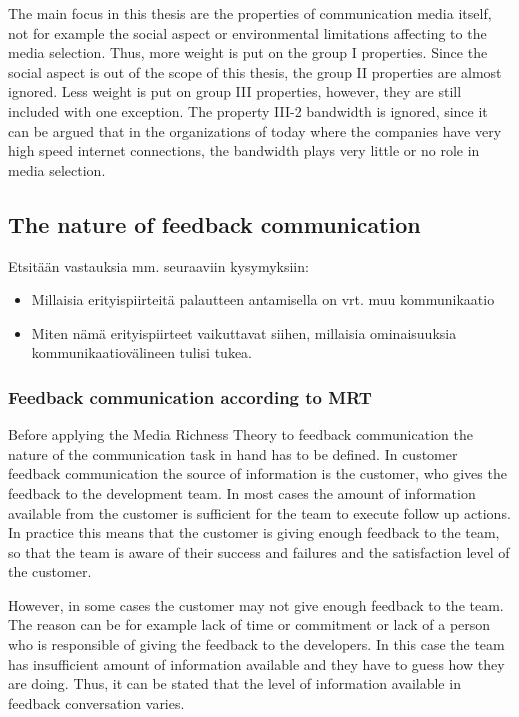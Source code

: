 \documentclass[english,12pt,a4paper,pdftex]{article}
\begin{document}
The main focus in this thesis are the properties of communication media itself, not for example the social aspect or environmental limitations affecting to the media selection. Thus, more weight is put on the group I properties. Since the social aspect is out of the scope of this thesis, the group II properties are almost ignored. Less weight is put on group III properties, however, they are still included with one exception. The property III-2 bandwidth is ignored, since it can be argued that in the organizations of today where the companies have very high speed internet connections, the bandwidth plays very little or no role in media selection.

\subsection{The nature of feedback communication}

Etsitään vastauksia mm. seuraaviin kysymyksiin:

\begin{itemize}
\item Millaisia erityispiirteitä palautteen antamisella on vrt. muu kommunikaatio
\item Miten nämä erityispiirteet vaikuttavat siihen, millaisia ominaisuuksia kommunikaatiovälineen tulisi tukea.
\end{itemize}



\subsubsection{Feedback communication according to MRT}

Before applying the Media Richness Theory to feedback communication the nature of the communication task in hand has to be defined. In customer feedback communication the source of information is the customer, who gives the feedback to the development team. In most cases the amount of information available from the customer is sufficient for the team to execute follow up actions. In practice this means that the customer is giving enough feedback to the team, so that the team is aware of their success and failures and the satisfaction level of the customer.

However, in some cases the customer may not give enough feedback to the team. The reason can be for example lack of time or commitment or lack of a person who is responsible of giving the feedback to the developers. In this case the team has insufficient amount of information available and they have to guess how they are doing. Thus, it can be stated that the level of information available in feedback conversation varies. 
\end{document}
